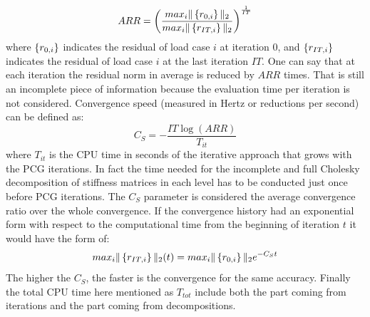  \begin{equation}
 \label{eq.arr}
 ARR=\left(\frac{max_i\|\left\lbrace{r_{0,i}}\right \rbrace\|_2}{max_i\|\left\lbrace{r_{IT,i}}\right \rbrace\|_2}\right)^{\frac{1}{IT}}
 \end{equation}
 where $\left\lbrace{r_{0,i}}\right \rbrace$ indicates the residual of load case $i$ at iteration 0, and $\left\lbrace{r_{IT,i}}\right \rbrace$ indicates the residual of load case $i$ at the last iteration $IT$.
 One can say that at each iteration the residual norm in average is reduced by $ARR$ times. That is still an incomplete piece of information because the evaluation time per iteration is not considered.
 Convergence speed (measured in Hertz or reductions per second) can be defined as:
 \begin{equation}
 \label{eq.cs}
 C_S=-\frac{IT \log\left(ARR\right)}{T_{it}}
 \end{equation}
 where $T_{it}$ is the CPU time in seconds of the iterative approach that grows with the PCG iterations. In fact the time needed for the incomplete and full Cholesky decomposition of stiffness matrices in each level has to be conducted just once before PCG iterations. The $C_S$ parameter is considered the average convergence ratio over the whole convergence. If the convergence history had an exponential form with respect to the computational time from the beginning of iteration $t$ it would have the form of:
 \begin{equation}
 max_i\|\left\lbrace{r_{IT,i}}\right \rbrace\|_2(t)=max_i\|\left\lbrace{r_{0,i}}\right \rbrace\|_2e^{-C_St}
 \end{equation}
 The higher the $C_S$, the faster is the convergence for the same accuracy. 
  Finally the total CPU time here mentioned as ${T_{tot}}$ include both the part coming from iterations and the part coming from decompositions.
